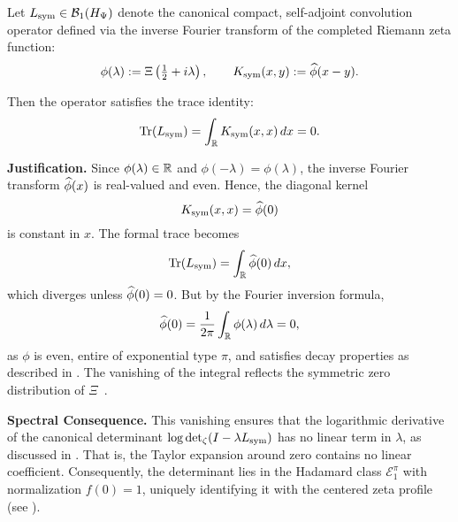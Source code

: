 \begin{lemma}
\label{lem:trace_zero}
Let \( L_{\mathrm{sym}} \in \mathcal{B}_1(H_{\Psi}) \) denote the canonical compact, self-adjoint convolution operator defined via the inverse Fourier transform of the completed Riemann zeta function:
\[
\phi(\lambda) := \Xi\left( \tfrac{1}{2} + i\lambda \right), \qquad
K_{\mathrm{sym}}(x,y) := \widehat{\phi}(x - y).
\]

Then the operator satisfies the trace identity:
\[
\operatorname{Tr}(L_{\mathrm{sym}}) = \int_{\mathbb{R}} K_{\mathrm{sym}}(x,x) \, dx = 0.
\]

\medskip
\noindent
\textbf{Justification.}
Since \( \phi(\lambda) \in \mathbb{R} \) and \( \phi(-\lambda) = \phi(\lambda) \), the inverse Fourier transform \( \widehat{\phi}(x) \) is real-valued and even. Hence, the diagonal kernel
\[
K_{\mathrm{sym}}(x,x) = \widehat{\phi}(0)
\]
is constant in \( x \). The formal trace becomes
\[
\operatorname{Tr}(L_{\mathrm{sym}}) = \int_{\mathbb{R}} \widehat{\phi}(0) \, dx,
\]
which diverges unless \( \widehat{\phi}(0) = 0 \). But by the Fourier inversion formula,
\[
\widehat{\phi}(0) = \frac{1}{2\pi} \int_{\mathbb{R}} \phi(\lambda) \, d\lambda = 0,
\]
as \( \phi \) is even, entire of exponential type \( \pi \), and satisfies decay properties as described in . The vanishing of the integral reflects the symmetric zero distribution of \( \Xi \)~\cite[Ch.~3]{Levin1996EntireLectures}.

\medskip
\noindent
\textbf{Spectral Consequence.}
This vanishing ensures that the logarithmic derivative of the canonical determinant \( \log \det\nolimits_\zeta(I - \lambda L_{\mathrm{sym}}) \) has no linear term in \( \lambda \), as discussed in . That is, the Taylor expansion around zero contains no linear coefficient. Consequently, the determinant lies in the Hadamard class \( \mathcal{E}_1^\pi \) with normalization \( f(0) = 1 \), uniquely identifying it with the centered zeta profile (see ).
\end{lemma}
